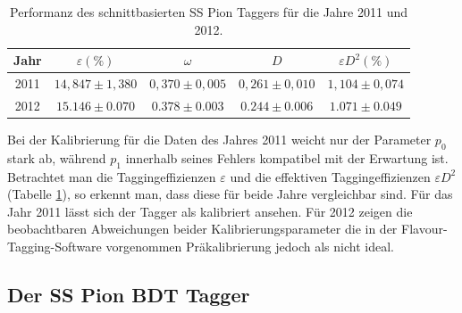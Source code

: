 \begin{table}[htbp]
	\centering
	\caption{Performanz des schnittbasierten SS Pion Taggers für die Jahre \num{2011} und \num{2012}.}
	\label{tab:performance_SSPion}
	\begin{tabular}{ccccc}
	\toprule
       Jahr & $\varepsilon(\%)$ & $\omega$ & $D$ & $\varepsilon D^2(\%)$ \\ 
       \midrule
   2011 & $14{,}847\pm1{,}380$& $0{,}370\pm0{,}005$ & $0{,}261\pm0{,}010$ & $1{,}104\pm0{,}074$\\ 
   2012 & $15{.}146\pm0{.}070$ & $0{.}378\pm0{.}003$ & $0{.}244\pm0{.}006$ & $1{.}071\pm0{.}049$\\ 
   \bottomrule
	\end{tabular}
\end{table}
Bei der Kalibrierung für die Daten des Jahres \num{2011} weicht nur der Parameter $p_0$ stark ab, während $p_1$ innerhalb seines Fehlers kompatibel mit der Erwartung ist. \\
Betrachtet man die Taggingeffizienzen $\varepsilon$ und die effektiven Taggingeffizienzen $\varepsilon D^2$ (Tabelle \ref{tab:performance_SSPion}), so erkennt man, dass diese für beide Jahre vergleichbar sind. Für das Jahr \num{2011} lässt sich der Tagger als kalibriert ansehen. Für \num{2012}  zeigen die beobachtbaren Abweichungen beider Kalibrierungsparameter die in der Flavour-Tagging-Software vorgenommen Präkalibrierung jedoch als nicht ideal.  

\subsection{Der SS Pion BDT Tagger}

